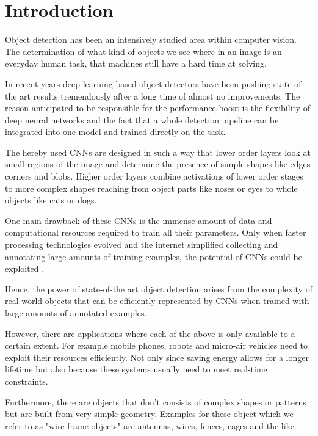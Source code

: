 \chapter{Introduction}
\label{sec:intro}

Object detection has been an intensively studied area within computer vision. The determination of what kind of objects we see where in an image is an everyday human task, that machines still have a hard time at solving.

In recent years deep learning based object detectors have been pushing state of the art results tremendously after a long time of almost no improvements. The reason anticipated to be responsible for the performance boost is the flexibility of deep neural networks and the fact that a whole detection pipeline can be integrated into one model and trained directly on the task.

The hereby used \acp{CNN} are designed in such a way that lower order layers look at small regions of the image and determine the presence of simple shapes like edges corners and blobs. Higher order layers combine activations of lower order stages to more complex shapes reaching from object parts like noses or eyes to whole objects like cats or dogs.

One main drawback of these \acp{CNN} is the immense amount of data and computational resources required to train all their parameters. Only when faster processing technologies evolved and the internet simplified collecting and annotating large amounts of training examples, the potential of \acp{CNN} could be exploited . 

Hence, the power of state-of-the art object detection arises from the complexity of real-world objects that can be efficiently represented by \acp{CNN} when trained with large amounts of annotated examples.

However, there are applications where each of the above is only available to a certain extent. For example mobile phones, robots and micro-air vehicles need to exploit their resources efficiently. Not only since saving energy allows for a longer lifetime but also because these systems usually need to meet real-time constraints.

Furthermore, there are objects that don't consists of complex shapes or patterns but are built from very simple geometry. Examples for these object which we refer to as "wire frame objects" are antennas, wires, fences, cages and the like.  

